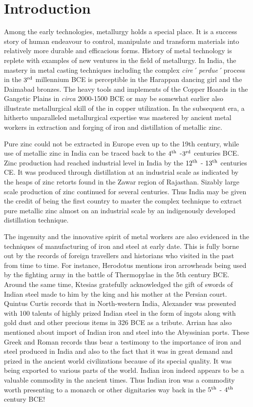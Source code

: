 \chapter{Introduction}\label{chapter1}


Among the early technologies, metallurgy holds a special place. It is a success story of human endeavour to control, manipulate and transform materials into relatively more durable and efficacious forms. History of metal technology is replete with examples of new ventures in the field of metallurgy. In India, the mastery in metal casting techniques including the complex \textit{cire´ perdue´} process in the $3^{\rm rd}$ millennium BCE is perceptible in the Harappan dancing girl and the Daimabad bronzes. The heavy tools and implements of the Copper Hoards in the Gangetic Plains in \textit{circa} 2000-1500 BCE or may be somewhat earlier also illustrate metallurgical skill of the in copper utilization. In the subsequent era, a hitherto unparalleled metallurgical expertise was mastered by ancient metal workers in extraction and forging of iron and distillation of metallic zinc. 

Pure zinc could not be extracted in Europe even up to the 19th century, while use of metallic zinc in India can be traced back to the $4^{\rm th}$ -$3^{\rm rd}$ centuries BCE. Zinc production had reached industrial level in India by the $12^{\rm th}$ - $13^{\rm th}$ centuries CE. It was produced through distillation at an industrial scale as indicated by the heaps of zinc retorts found in the Zawar region of Rajasthan. Sizably large scale production of zinc continued for several centuries. Thus India may be given the credit of being the first country to master the complex technique to extract pure metallic zinc almost on an industrial scale by an indigenously developed distillation technique.

The ingenuity and the innovative spirit of metal workers are also evidenced in the techniques of manufacturing of iron and steel at early date. This is fully borne out by the records of foreign travellers and historians who visited in the past from time to time. For instance, Herodotus mentions iron arrowheads being used by the fighting army in the battle of Thermopylae in the 5th century BCE. Around the same time, Ktesias gratefully acknowledged the gift of swords of Indian steel made to him by the king and his mother at the Persian court. Quintus Curtis records that in North-western India, Alexander was presented with 100 talents of highly prized Indian steel in the form of ingots along with gold dust and other precious items in 326 BCE as a tribute. Arrian has also mentioned about import of Indian iron and steel into the Abyssinian ports. These Greek and Roman records thus bear a testimony to the importance of iron and steel produced in India and also to the fact that it was in great demand and prized in the ancient world civilizations because of its special quality. It was being exported to various parts of the world. Indian iron indeed appears to be a valuable commodity in the ancient times. Thus Indian iron was a commodity worth presenting to a monarch or other dignitaries way back in the $5^{\rm th}$ - $4^{\rm th}$ century BCE! 

